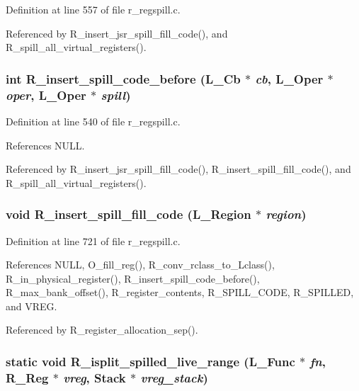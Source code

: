 Definition at line 557 of file r\_\-regspill.c.

Referenced by R\_\-insert\_\-jsr\_\-spill\_\-fill\_\-code(), and R\_\-spill\_\-all\_\-virtual\_\-registers().
\subsubsection{\setlength{\rightskip}{0pt plus 5cm}int R\_\-insert\_\-spill\_\-code\_\-before (L\_\-Cb $\ast$ {\em cb}, L\_\-Oper $\ast$ {\em oper}, L\_\-Oper $\ast$ {\em spill})}\label{r__regspill_8c_1db85fe134ec9b6246968d8aed301d5c}




Definition at line 540 of file r\_\-regspill.c.

References NULL.

Referenced by R\_\-insert\_\-jsr\_\-spill\_\-fill\_\-code(), R\_\-insert\_\-spill\_\-fill\_\-code(), and R\_\-spill\_\-all\_\-virtual\_\-registers().
\subsubsection{\setlength{\rightskip}{0pt plus 5cm}void R\_\-insert\_\-spill\_\-fill\_\-code (L\_\-Region $\ast$ {\em region})}\label{r__regspill_8c_333b12c97f89b00c2e5f48150f08dbeb}




Definition at line 721 of file r\_\-regspill.c.

References NULL, O\_\-fill\_\-reg(), R\_\-conv\_\-rclass\_\-to\_\-Lclass(), R\_\-in\_\-physical\_\-register(), R\_\-insert\_\-spill\_\-code\_\-before(), R\_\-max\_\-bank\_\-offset(), R\_\-register\_\-contents, R\_\-SPILL\_\-CODE, R\_\-SPILLED, and VREG.

Referenced by R\_\-register\_\-allocation\_\-sep().
\subsubsection{\setlength{\rightskip}{0pt plus 5cm}static void R\_\-isplit\_\-spilled\_\-live\_\-range (L\_\-Func $\ast$ {\em fn}, \bf{R\_\-Reg} $\ast$ {\em vreg}, \bf{Stack} $\ast$ {\em vreg\_\-stack})\hspace{0.3cm}{\tt  [static]}}\label{r__regspill_8c_a7c850aab587fee3c8d18f7d382e2765}




